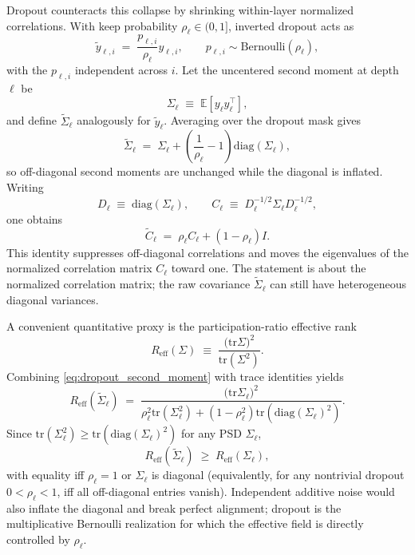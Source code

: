 \documentclass{article}
\theoremstyle{plain}
\theoremstyle{definition}
\theoremstyle{remark}
\begin{document}
Dropout counteracts this collapse by shrinking within-layer normalized correlations. With keep probability $\rho_\ell\in(0,1]$, inverted dropout acts as
\relax
\begin{equation}
\tilde y_{\ell,i} \;=\; \frac{p_{\ell,i}}{\rho_\ell} y_{\ell,i}, \qquad p_{\ell,i}\sim \mathrm{Bernoulli}(\rho_\ell),
\end{equation}
\relax
with the $p_{\ell,i}$ independent across $i$. Let the uncentered second moment at depth $\ell$ be
\relax
\begin{equation}
\Sigma_\ell \;\equiv\; \mathbb{E}\left[y_\ell y_\ell^\top\right],
\end{equation}
\relax
and define $\tilde\Sigma_\ell$ analogously for $\tilde y_\ell$. Averaging over the dropout mask gives
\relax
\begin{equation}
\tilde\Sigma_\ell \;=\; \Sigma_\ell + \left(\frac{1}{\rho_\ell}-1\right)\mathrm{diag}(\Sigma_\ell),
\label{eq:dropout_second_moment}
\end{equation}
\relax
so off-diagonal second moments are unchanged while the diagonal is inflated. Writing
\relax
\begin{equation}
D_\ell \;\equiv\; \mathrm{diag}(\Sigma_\ell), \qquad C_\ell \;\equiv\; D_\ell^{-1/2}\Sigma_\ell D_\ell^{-1/2},
\end{equation}
\relax
one obtains
\relax
\begin{equation}
\tilde C_\ell \;=\; \rho_\ell C_\ell + (1-\rho_\ell) I.
\label{eq:dropout_corr_shrinkage}
\end{equation}
\relax
This identity suppresses off-diagonal correlations and moves the eigenvalues of the normalized correlation matrix \(C_\ell\) toward one. The statement is about the normalized correlation matrix; the raw covariance \(\tilde\Sigma_\ell\) can still have heterogeneous diagonal variances.

A convenient quantitative proxy is the participation-ratio effective rank
\relax
\begin{equation}
R_{\mathrm{eff}}(\Sigma) \;\equiv\; \frac{\bigl(\mathrm{tr} \Sigma\bigr)^2}{\mathrm{tr}\left(\Sigma^2\right)}.
\end{equation}
\relax
Combining \eqref{eq:dropout_second_moment} with trace identities yields
\relax
\begin{equation}
R_{\mathrm{eff}}\left(\tilde\Sigma_\ell\right) \;=\; \frac{\bigl(\mathrm{tr} \Sigma_\ell\bigr)^2}{ \rho_\ell^2 \mathrm{tr}\left(\Sigma_\ell^2\right) + \left(1-\rho_\ell^2\right)\mathrm{tr}\left(\mathrm{diag}(\Sigma_\ell)^2\right)}.
\end{equation}
\relax
Since $\mathrm{tr}(\Sigma_\ell^2)\ge \mathrm{tr}(\mathrm{diag}(\Sigma_\ell)^2)$ for any PSD $\Sigma_\ell$,
\relax
\begin{equation}
R_{\mathrm{eff}}\left(\tilde\Sigma_\ell\right)\;\ge\;R_{\mathrm{eff}}(\Sigma_\ell),
\end{equation}
\relax
with equality iff \(\rho_\ell=1\) or \(\Sigma_\ell\) is diagonal (equivalently, for any nontrivial dropout \(0<\rho_\ell<1\), iff all off-diagonal entries vanish). Independent additive noise would also inflate the diagonal and break perfect alignment; dropout is the multiplicative Bernoulli realization for which the effective field is directly controlled by $\rho_\ell$.
\end{document}
